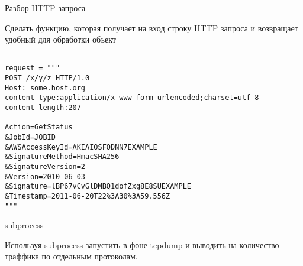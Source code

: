 \documentclass{article}
\begin{document}
\begin{center} Разбор HTTP запроса \end{center}
Сделать функцию, которая получает на вход строку HTTP запроса
и возвращает удобный для обработки объект
\begin{lstlisting}

request = """
POST /x/y/z HTTP/1.0
Host: some.host.org
content-type:application/x-www-form-urlencoded;charset=utf-8
content-length:207

Action=GetStatus
&JobId=JOBID
&AWSAccessKeyId=AKIAIOSFODNN7EXAMPLE
&SignatureMethod=HmacSHA256
&SignatureVersion=2
&Version=2010-06-03
&Signature=lBP67vCvGlDMBQ1dofZxg8E8SUEXAMPLE
&Timestamp=2011-06-20T22%3A30%3A59.556Z
"""

\end{lstlisting}
\newpage

\begin{center} subprocess \end{center}
Используя subprocess запустить в фоне tcpdump и выводить на количество траффика
по отдельным протоколам.
\newpage

\end{document}
